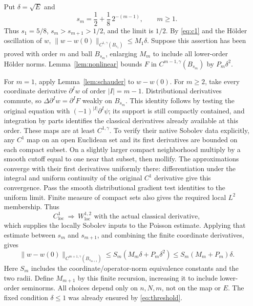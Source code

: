 \documentclass[11pt,a4paper]{article}
\numberwithin{equation}{section}
\theoremstyle{definition}
\theoremstyle{remark}
\begin{document}
Put \(\delta=\sqrt E\) and
\begin{equation}\label{eq:nested}
 s_m=\frac12+\frac18\,2^{-(m-1)},\qquad m\ge1.
\end{equation}
Thus \(s_1=5/8\), \(s_m>s_{m+1}>1/2\), and the limit is \(1/2\).
By \eqref{eq:c1} and the H\"older oscillation of \(w\),
\(\|w-w(0)\|_{C^{1,\gamma}(B_{s_1})}\le M_1\delta\).
Suppose this assertion has been proved with order \(m\) and ball
\(B_{s_m}\), enlarging \(M_m\) to include all lower-order H\"older norms.
Lemma~\ref{lem:nonlinear} bounds \(F\) in \(C^{m-1,\gamma}(B_{s_m})\)
by \(P_m\delta^2\).

For \(m=1\), apply Lemma~\ref{lem:schauder} to \(w-w(0)\).
For \(m\ge2\), take every coordinate derivative \(\partial^I w\)
of order \(|I|=m-1\). Distributional derivatives commute, so
\(\Delta\partial^Iw=\partial^IF\) weakly on \(B_{s_m}\).
This identity follows by testing the original equation with
\((-1)^{|I|}\partial^I\psi\); its support is still compactly contained,
and integration by parts identifies the classical derivatives already
available at this order. These maps are at least \(C^{1,\gamma}\).
To verify their native Sobolev data explicitly, any \(C^1\) map on an
open Euclidean set and its first derivatives are bounded on each compact
subset. On a slightly larger compact neighborhood multiply by a smooth
cutoff equal to one near that subset, then mollify. The approximations
converge with their first derivatives uniformly there: differentiation
under the integral and uniform continuity of the original \(C^1\)
derivative give this convergence. Pass the smooth distributional
gradient test identities to the uniform limit. Finite measure of compact
sets also gives the required local \(L^2\) membership. Thus
\begin{equation}\label{eq:c1sobolev}
 C^1_{\mathrm{loc}}\ \Longrightarrow\
 W^{1,2}_{\mathrm{loc}}\text{ with the actual classical derivative},
\end{equation}
which supplies the locally Sobolev inputs to the Poisson estimate.
Applying that estimate between \(s_m\) and \(s_{m+1}\), and combining
the finite coordinate derivatives, gives
\[
 \|w-w(0)\|_{C^{m+1,\gamma}(B_{s_{m+1}})}
 \le S_m(M_m\delta+P_m\delta^2)
 \le S_m(M_m+P_m)\delta.
\]
Here \(S_m\) includes the coordinate/operator-norm equivalence constants
and the two radii. Define \(M_{m+1}\) by this finite recursion, increasing
it to include lower-order seminorms. All choices depend only on \(n,N,m\),
not on the map or \(E\). The fixed condition \(\delta\le1\) was already
ensured by \eqref{eq:threshold}.
\end{document}
